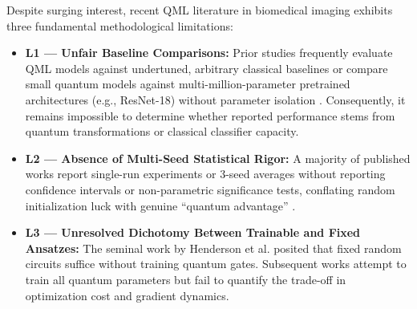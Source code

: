 \documentclass[journal]{IEEEtran}
\begin{document}
Despite surging interest, recent QML literature in biomedical imaging \cite{vu2024exploring, altares2021automatic, azevedo2022quantum, hoang2023efficient, matondo2024breast, schuld2022advantage} exhibits three fundamental methodological limitations:
\begin{itemize}
    \item \textbf{L1 --- Unfair Baseline Comparisons:} Prior studies frequently evaluate QML models against undertuned, arbitrary classical baselines or compare small quantum models against multi-million-parameter pretrained architectures (e.g., ResNet-18) without parameter isolation \cite{azevedo2022quantum}. Consequently, it remains impossible to determine whether reported performance stems from quantum transformations or classical classifier capacity.
    \item \textbf{L2 --- Absence of Multi-Seed Statistical Rigor:} A majority of published works report single-run experiments or 3-seed averages without reporting confidence intervals or non-parametric significance tests, conflating random initialization luck with genuine ``quantum advantage'' \cite{kubler2021inductive}.
    \item \textbf{L3 --- Unresolved Dichotomy Between Trainable and Fixed Ansatzes:} The seminal work by Henderson et al. \cite{henderson2020quanvolutional} posited that fixed random circuits suffice without training quantum gates. Subsequent works attempt to train all quantum parameters but fail to quantify the trade-off in optimization cost and gradient dynamics.
\end{itemize}
\end{document}
